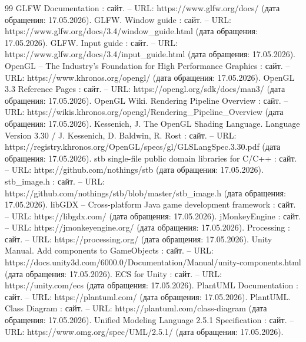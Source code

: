 \begin{thebibliography}{99}
	 GLFW Documentation : сайт. -- URL: https://www.glfw.org/docs/ (дата обращения: 17.05.2026).
	 GLFW. Window guide : сайт. -- URL: https://www.glfw.org/docs/3.4/window\_guide.html (дата обращения: 17.05.2026).
	 GLFW. Input guide : сайт. -- URL: https://www.glfw.org/docs/3.4/input\_guide.html (дата обращения: 17.05.2026).
	 OpenGL -- The Industry's Foundation for High Performance Graphics : сайт. -- URL: https://www.khronos.org/opengl/ (дата обращения: 17.05.2026).
	 OpenGL 3.3 Reference Pages : сайт. -- URL: https://opengl.org/sdk/docs/man3/ (дата обращения: 17.05.2026).
	 OpenGL Wiki. Rendering Pipeline Overview : сайт. -- URL: https://wikis.khronos.org/opengl/Rendering\_Pipeline\_Overview (дата обращения: 17.05.2026).
	 Kessenich, J. The OpenGL Shading Language. Language Version 3.30 / J. Kessenich, D. Baldwin, R. Rost : сайт. -- URL: https://registry.khronos.org/OpenGL/specs/gl/\allowbreak GLSLangSpec.3.30.pdf (дата обращения: 17.05.2026).
	 stb single-file public domain libraries for C/C++ : сайт. -- URL: https://github.com/nothings/stb (дата обращения: 17.05.2026).
	 stb\_image.h : сайт. -- URL: https://github.com/nothings/stb/blob/master/\allowbreak stb\_image.h (дата обращения: 17.05.2026).
	 libGDX -- Cross-platform Java game development framework : сайт. -- URL: https://libgdx.com/ (дата обращения: 17.05.2026).
	 jMonkeyEngine : сайт. -- URL: https://jmonkeyengine.org/ (дата обращения: 17.05.2026).
	 Processing : сайт. -- URL: https://processing.org/ (дата обращения: 17.05.2026).
	 Unity Manual. Add components to GameObjects : сайт. -- URL: https://docs.unity3d.com/6000.0/Documentation/Manual/\allowbreak unity-components.html (дата обращения: 17.05.2026).
	 ECS for Unity : сайт. -- URL: https://unity.com/ecs (дата обращения: 17.05.2026).
	 PlantUML Documentation : сайт. -- URL: https://plantuml.com/ (дата обращения: 17.05.2026).
	 PlantUML. Class Diagram : сайт. -- URL: https://plantuml.com/class-diagram (дата обращения: 17.05.2026).
	 Unified Modeling Language 2.5.1 Specification : сайт. -- URL: https://www.omg.org/spec/UML/2.5.1/ (дата обращения: 17.05.2026).
\end{thebibliography}
